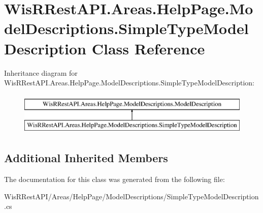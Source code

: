 \hypertarget{class_wis_r_rest_a_p_i_1_1_areas_1_1_help_page_1_1_model_descriptions_1_1_simple_type_model_description}{}\section{Wis\+R\+Rest\+A\+P\+I.\+Areas.\+Help\+Page.\+Model\+Descriptions.\+Simple\+Type\+Model\+Description Class Reference}
\label{class_wis_r_rest_a_p_i_1_1_areas_1_1_help_page_1_1_model_descriptions_1_1_simple_type_model_description}
Inheritance diagram for Wis\+R\+Rest\+A\+P\+I.\+Areas.\+Help\+Page.\+Model\+Descriptions.\+Simple\+Type\+Model\+Description\+:\begin{figure}[H]
\begin{center}
\leavevmode
\includegraphics[height=2.000000cm]{class_wis_r_rest_a_p_i_1_1_areas_1_1_help_page_1_1_model_descriptions_1_1_simple_type_model_description}
\end{center}
\end{figure}
\subsection*{Additional Inherited Members}


The documentation for this class was generated from the following file\+:\begin{DoxyCompactItemize}
\item 
Wis\+R\+Rest\+A\+P\+I/\+Areas/\+Help\+Page/\+Model\+Descriptions/Simple\+Type\+Model\+Description.\+cs\end{DoxyCompactItemize}
